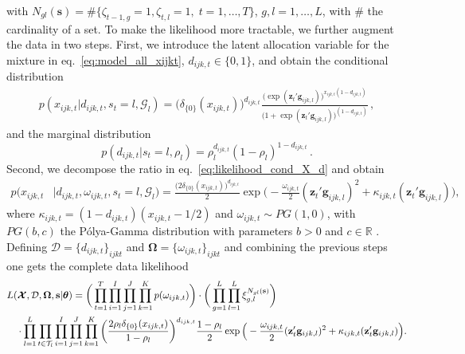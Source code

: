\documentclass[12pt,a4paper]{article}
\def \R{\mathds{R}}
\theoremstyle{custom}
\begin{document}
with $N_{gl}(\mathbf{s}) = \# \lbrace \zeta_{t-1,g}=1, \zeta_{t,l}=1, \; t=1,\ldots,T \rbrace$, $g,l=1,\ldots,L$, with $\#$ the cardinality of a set.
To make the likelihood more tractable, we further augment the data in two steps. First, we introduce the latent allocation variable for the mixture in eq.~\eqref{eq:model_all_xijkt}, $d_{ijk,t} \in \lbrace 0,1 \rbrace$, and obtain the conditional distribution
\begin{align}
p(x_{ijk,t}|d_{ijk,t},s_t=l,\mathcal{G}_l) = \big( \delta_{\lbrace 0 \rbrace}(x_{ijk,t}) \big)^{d_{ijk,t}} \frac{ \big( \exp(\mathbf{z}_t' \mathbf{g}_{ijk,l}) \big)^{x_{ijk,t}(1-d_{ijk,t})}}{ \big( 1+\exp( \mathbf{z}_t' \mathbf{g}_{ijk,l}) \big)^{(1-d_{ijk,t})}} \, ,
\label{eq:likelihood_cond_X_d}
\end{align}
and the marginal distribution
\begin{equation}
p(d_{ijk,t}|s_t=l,\rho_l) = \rho_l^{d_{ijk,t}} (1-\rho_l)^{1-d_{ijk,t}} \, .
\label{eq:marginal_d}
\end{equation}
Second, we decompose the ratio in eq.~\eqref{eq:likelihood_cond_X_d} and obtain
\begin{align}
p(x_{ijk,t} & | d_{ijk,t},\omega_{ijk,t},s_t=l,\mathcal{G}_l) = \frac{\big( 2\delta_{\lbrace 0 \rbrace}(x_{ijk,t}) \big)^{d_{ijk,t}}}{2} \exp\Big( -\frac{\omega_{ijk,t}}{2}(\mathbf{z}_t' \mathbf{g}_{ijk,l})^2 +\kappa_{ijk,t}(\mathbf{z}_t' \mathbf{g}_{ijk,l}) \Big),
\label{eq:likelihood_conditional_X_d_omega}
\end{align}
where $\kappa_{ijk,t} = (1-d_{ijk,t}) (x_{ijk,t} - 1/2)$ and $\omega_{ijk,t} \sim PG(1,0)$, with $PG(b,c)$ the P\'olya-Gamma distribution with parameters $b >0$ and $c \in \R$ \cite[][Theorem 1]{Polsonetal13PolyaGamma}.
Defining $\mathcal{D} = \lbrace d_{ijk,t} \rbrace_{ijkt}$ and $\boldsymbol{\Omega} = \lbrace \omega_{ijk,t} \rbrace_{ijkt}$ and combining the previous steps one gets the complete data likelihood
\begin{align}
\notag
 & L(\boldsymbol{\mathcal{X}},\mathcal{D},\boldsymbol{\Omega},\mathbf{s}|\boldsymbol{\theta}) = \bigg( \prod_{t=1}^T \prod_{i=1}^I \prod_{j=1}^J \prod_{k=1}^K p(\omega_{ijk,t}) \bigg) \cdot \bigg( \prod_{g=1}^L \prod_{l=1}^L \xi_{g,l}^{N_{gl}(\mathbf{s})} \bigg) \\
 & \quad \cdot \prod_{l=1}^L \prod_{t\in \mathcal{T}_l} \prod_{i=1}^I \prod_{j=1}^J \prod_{k=1}^K \bigg( \frac{2\rho_l \delta_{\lbrace 0 \rbrace}(x_{ijk,t})}{1-\rho_l} \bigg)^{d_{ijk,t}} \frac{1-\rho_l}{2} \exp\Big( -\dfrac{\omega_{ijk,t}}{2}(\mathbf{z}_t' \mathbf{g}_{ijk,l})^2 +\kappa_{ijk,t}(\mathbf{z}_t' \mathbf{g}_{ijk,l}) \Big).
\label{eq:complete_likelihood_final}
\end{align}
\end{document}
